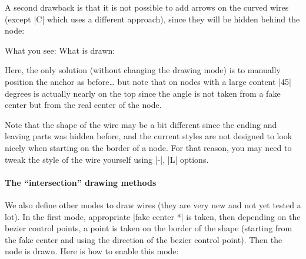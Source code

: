 \documentclass[a4paper,doc2]{ltxdoc} %
\begin{document}
A second drawback is that it is not possible to add arrows on the curved wires (except |C| which uses a different approach), since they will be hidden behind the node:
\begin{codeexample}[]
  What you see:
  \zx{\zxZ{\alpha+\beta} \ar[dr,s,<->] \\
                         & \zxZ{\alpha+\beta}}
  What is drawn:
\end{codeexample}
Here, the only solution (without changing the drawing mode) is to manually position the anchor as before\dots{} but note that on nodes with a large content |45| degrees is actually nearly on the top since the angle is not taken from a fake center but from the real center of the node.
\begin{codeexample}[]
  \zx{\zxZ{\alpha+\beta} \ar[dr,s,<->,start anchor=-45,end anchor=180-45] \\
                         & \zxZ{\alpha+\beta}}
  \zx{\zxZ{\alpha+\beta} \ar[dr,s,<->,start anchor=-15,end anchor=180-15] \\
                         & \zxZ{\alpha+\beta}}
\end{codeexample}
 Note that the shape of the wire may be a bit different since the ending and leaving parts was hidden before, and the current styles are not designed to look nicely when starting on the border of a node. For that reason, you may need to tweak the style of the wire yourself using |-|, |L| options.

 \paragraph{The ``intersection'' drawing methods}

 We also define other modes to draw wires (they are very new and not yet tested a lot). In the first mode, appropriate |fake center *| is taken, then depending on the bezier control points, a point is taken on the border of the shape (starting from the fake center and using the direction of the bezier control point). Then the node is drawn. Here is how to enable this mode:
\end{document}
